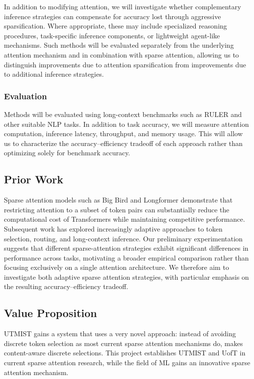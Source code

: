 \documentclass{article}
\begin{document}
In addition to modifying attention, we will investigate whether complementary inference strategies can compensate for accuracy lost through aggressive sparsification. Where appropriate, these may include specialized reasoning procedures, task-specific inference components, or lightweight agent-like mechanisms. Such methods will be evaluated separately from the underlying attention mechanism and in combination with sparse attention, allowing us to distinguish improvements due to attention sparsification from improvements due to additional inference strategies.

\subsubsection{Evaluation}

Methods will be evaluated using long-context benchmarks such as RULER and other suitable NLP tasks. In addition to task accuracy, we will measure attention computation, inference latency, throughput, and memory usage. This will allow us to characterize the accuracy–efficiency tradeoff of each approach rather than optimizing solely for benchmark accuracy.

\subsection{Prior Work} %
Sparse attention models such as Big Bird \cite{bigbird} and Longformer \cite{longformer} demonstrate that restricting attention to a subset of token pairs can substantially reduce the computational cost of Transformers while maintaining competitive performance. Subsequent work has explored increasingly adaptive approaches to token selection, routing, and long-context inference. Our preliminary experimentation suggests that different sparse-attention strategies exhibit significant differences in performance across tasks, motivating a broader empirical comparison rather than focusing exclusively on a single attention architecture. We therefore aim to investigate both adaptive sparse attention strategies, with particular emphasis on the resulting accuracy–efficiency tradeoff.



\subsection{Value Proposition}
UTMIST gains a system that uses a very novel approach: instead of avoiding discrete token selection as most current sparse attention mechanisms do, makes content-aware discrete selections. This project establishes UTMIST and UofT in current sparse attention research, while the field of ML gains an innovative sparse attention mechanism.
\end{document}
